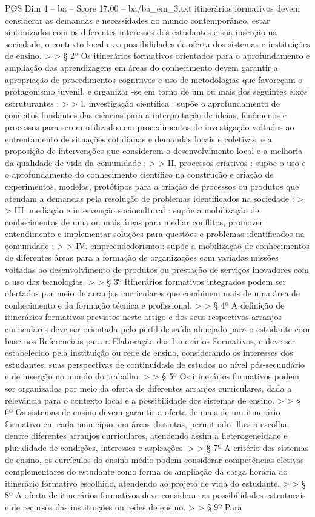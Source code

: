 \begin{textsample}{POS Dim 4 – ba – Score 17.00 – ba/ba\_em\_3.txt}
itinerários formativos devem considerar as demandas e necessidades do mundo contemporâneo, estar sintonizados com os diferentes interesses dos estudantes e sua inserção na sociedade, o contexto local e as possibilidades de oferta dos sistemas e instituições de ensino. > > § 2º Os itinerários formativos orientados para o aprofundamento e ampliação das aprendizagens em áreas do conhecimento devem garantir a apropriação de procedimentos cognitivos e uso de metodologias que favoreçam o protagonismo juvenil, e organizar -se em torno de um ou mais dos seguintes eixos estruturantes : > > I. investigação científica : supõe o aprofundamento de conceitos fundantes das ciências para a interpretação de ideias, fenômenos e processos para serem utilizados em procedimentos de investigação voltados ao enfrentamento de situações cotidianas e demandas locais e coletivas, e a proposição de intervenções que considerem o desenvolvimento local e a melhoria da qualidade de vida da comunidade ; > > II. processos criativos : supõe o uso e o aprofundamento do conhecimento científico na construção e criação de experimentos, modelos, protótipos para a criação de processos ou produtos que atendam a demandas pela resolução de problemas identificados na sociedade ; > > III. mediação e intervenção sociocultural : supõe a mobilização de conhecimentos de uma ou mais áreas para mediar conflitos, promover entendimento e implementar soluções para questões e problemas identificados na comunidade ; > > IV. empreendedorismo : supõe a mobilização de conhecimentos de diferentes áreas para a formação de organizações com variadas missões voltadas ao desenvolvimento de produtos ou prestação de serviços inovadores com o uso das tecnologias. > > § 3º Itinerários formativos integrados podem ser ofertados por meio de arranjos curriculares que combinem mais de uma área de conhecimento e da formação técnica e profissional. > > § 4º A definição de itinerários formativos previstos neste artigo e dos seus respectivos arranjos curriculares deve ser orientada pelo perfil de saída almejado para o estudante com base nos Referenciais para a Elaboração dos Itinerários Formativos, e deve ser estabelecido pela instituição ou rede de ensino, considerando os interesses dos estudantes, suas perspectivas de continuidade de estudos no nível pós-secundário e de inserção no mundo do trabalho. > > § 5º Os itinerários formativos podem ser organizados por meio da oferta de diferentes arranjos curriculares, dada a relevância para o contexto local e a possibilidade dos sistemas de ensino. > > § 6º Os sistemas de ensino devem garantir a oferta de mais de um itinerário formativo em cada município, em áreas distintas, permitindo -lhes a escolha, dentre diferentes arranjos curriculares, atendendo assim a heterogeneidade e pluralidade de condições, interesses e aspirações. > > § 7º A critério dos sistemas de ensino, os currículos do ensino médio podem considerar competências eletivas complementares do estudante como forma de ampliação da carga horária do itinerário formativo escolhido, atendendo ao projeto de vida do estudante. > > § 8º A oferta de itinerários formativos deve considerar as possibilidades estruturais e de recursos das instituições ou redes de ensino. > > § 9º Para 
\end{textsample}
